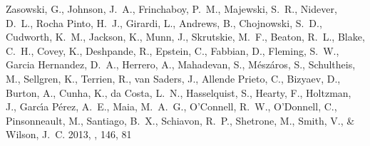 \documentclass[12pt, preprint]{aastex}
\begin{document}
\begin{thebibliography}{24}
{Zasowski}, G., {Johnson}, J.~A., {Frinchaboy}, P.~M., {Majewski}, S.~R.,
  {Nidever}, D.~L., {Rocha Pinto}, H.~J., {Girardi}, L., {Andrews}, B.,
  {Chojnowski}, S.~D., {Cudworth}, K.~M., {Jackson}, K., {Munn}, J.,
  {Skrutskie}, M.~F., {Beaton}, R.~L., {Blake}, C.~H., {Covey}, K.,
  {Deshpande}, R., {Epstein}, C., {Fabbian}, D., {Fleming}, S.~W., {Garcia
  Hernandez}, D.~A., {Herrero}, A., {Mahadevan}, S., {M{\'e}sz{\'a}ros}, S.,
  {Schultheis}, M., {Sellgren}, K., {Terrien}, R., {van Saders}, J., {Allende
  Prieto}, C., {Bizyaev}, D., {Burton}, A., {Cunha}, K., {da Costa}, L.~N.,
  {Hasselquist}, S., {Hearty}, F., {Holtzman}, J., {Garc{\'{\i}}a P{\'e}rez},
  A.~E., {Maia}, M.~A.~G., {O'Connell}, R.~W., {O'Donnell}, C., {Pinsonneault},
  M., {Santiago}, B.~X., {Schiavon}, R.~P., {Shetrone}, M., {Smith}, V., \&
  {Wilson}, J.~C. 2013, \aj, 146, 81

\end{thebibliography}


\end{document}
